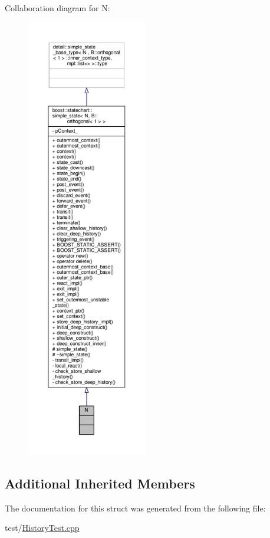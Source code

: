 Collaboration diagram for N\+:
\nopagebreak
\begin{figure}[H]
\begin{center}
\leavevmode
\includegraphics[height=550pt]{struct_n__coll__graph}
\end{center}
\end{figure}
\subsection*{Additional Inherited Members}


The documentation for this struct was generated from the following file\+:\begin{DoxyCompactItemize}
\item 
test/\mbox{\hyperlink{_history_test_8cpp}{History\+Test.\+cpp}}\end{DoxyCompactItemize}
